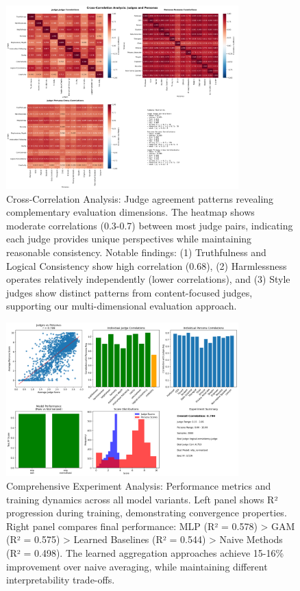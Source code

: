 \begin{figure}[htbp]
    \centering
    \includegraphics[width=0.8\textwidth]{results/full_experiments/baseline_ultrafeedback_2000samples_20250816_213023/plots/cross_correlation_heatmaps.png}
    \caption{Cross-Correlation Analysis: Judge agreement patterns revealing complementary evaluation dimensions. The heatmap shows moderate correlations (0.3-0.7) between most judge pairs, indicating each judge provides unique perspectives while maintaining reasonable consistency. Notable findings: (1) Truthfulness and Logical Consistency show high correlation (0.68), (2) Harmlessness operates relatively independently (lower correlations), and (3) Style judges show distinct patterns from content-focused judges, supporting our multi-dimensional evaluation approach.}
    \label{fig:cross_correlation}
\end{figure}

\begin{figure}[htbp]
    \centering
    \includegraphics[width=0.8\textwidth]{results/full_experiments/baseline_ultrafeedback_2000samples_20250816_213023/plots/experiment_analysis.png}
    \caption{Comprehensive Experiment Analysis: Performance metrics and training dynamics across all model variants. Left panel shows R² progression during training, demonstrating convergence properties. Right panel compares final performance: MLP (R² = 0.578) > GAM (R² = 0.575) > Learned Baselines (R² = 0.544) > Naive Methods (R² = 0.498). The learned aggregation approaches achieve 15-16\% improvement over naive averaging, while maintaining different interpretability trade-offs.}
    \label{fig:experiment_analysis}
\end{figure}

